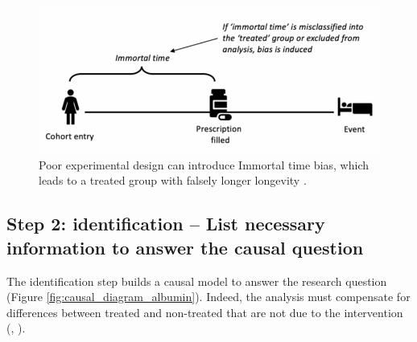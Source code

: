 \documentclass[french,12pt,twoside,a4paper]{book}
\begin{document}
\begin{figure}[!h]
  \begin{minipage}{.25\linewidth}
    \caption{Poor experimental design can introduce Immortal time bias, which
      leads to a treated group with falsely longer longevity
      \citep{lee2020immortaltimebias}.}\label{fig:immortal_time_bias}
  \end{minipage}%
  \hfill%
  \begin{minipage}{.7\linewidth}
    \includegraphics[width=\linewidth]{img/chapter_4/catalog_of_bias_immortal_time_bias.png}
  \end{minipage}
\end{figure}


\subsection{Step 2: identification -- List necessary information to answer the causal question}%
\label{subsec:causal_tuto:identification}%


The identification step builds a causal model to answer the research question
(Figure \ref{fig:causal_diagram_albumin}).
%
Indeed, the analysis must compensate for differences between treated and
non-treated that are not due to the intervention
(\cite[chapter~1]{pearl2018book}, \cite[chapter~1]{hernan2020causal}).
\end{document}
